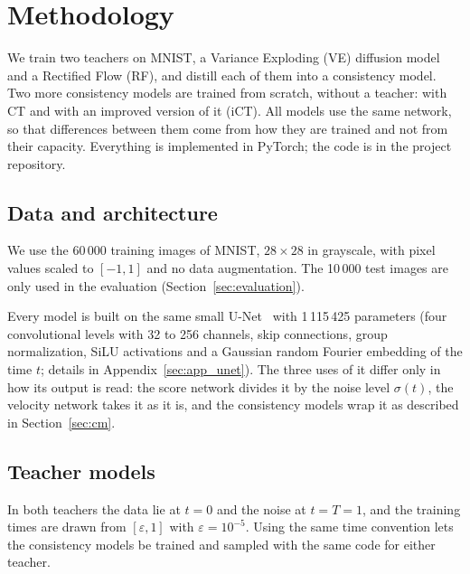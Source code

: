 \documentclass{article}
\begin{document}
\section{Methodology}
\label{sec:methodology}

We train two teachers on MNIST, a Variance Exploding (VE) diffusion model and
a Rectified Flow (RF), and distill each of them into a consistency model. Two
more consistency models are trained from scratch, without a teacher: with CT
and with an improved version of it (iCT). All models use the
same network, so that differences between them come from how they are
trained and not from their capacity. Everything is implemented in PyTorch;
the code is in the project repository.

\subsection{Data and architecture}
\label{sec:data}

We use the 60\,000 training images of MNIST, $28\times28$ in grayscale, with
pixel values scaled to $[-1, 1]$ and no data augmentation. The 10\,000 test
images are only used in the evaluation (Section~\ref{sec:evaluation}).

Every model is built on the same small U-Net~\cite{ronneberger2015unet} with
1\,115\,425 parameters (four convolutional levels with 32 to 256 channels,
skip connections, group normalization, SiLU activations and a Gaussian random
Fourier embedding of the time $t$; details in Appendix~\ref{sec:app_unet}).
The three uses of it differ only in how its output is read: the score network
divides it by the noise level $\sigma(t)$, the velocity network takes it as it
is, and the consistency models wrap it as described in Section~\ref{sec:cm}.

\subsection{Teacher models}
\label{sec:teachers}

In both teachers the data lie at $t = 0$ and the noise at $t = T = 1$, and the
training times are drawn from $[\varepsilon, 1]$ with $\varepsilon = 10^{-5}$.
Using the same time convention lets the consistency models be trained and
sampled with the same code for either teacher.
\end{document}
